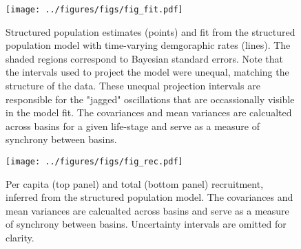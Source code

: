 \documentclass[11pt]{article}
\begin{document}
{%


\clearpage



\clearpage
\begin{figure}
\centering
\texttt{[image: ../figures/figs/fig\_fit.pdf]}
\caption{\label{fig:fit}
Structured population estimates (points) and 
fit from the structured population model 
with time-varying demgoraphic rates (lines). 
The shaded regions correspond to Bayesian standard errors.
Note that the intervals used to project the model were unequal,
matching the structure of the data.
These unequal projection intervals are responsible for the "jagged" oscillations
that are occassionally visible in the model fit.
The covariances and mean variances are calcualted across basins for a given life-stage
and serve as a measure of synchrony between basins.
}
\end{figure}
\clearpage

\clearpage
\begin{figure}
\centering
\texttt{[image: ../figures/figs/fig\_rec.pdf]}
\caption{\label{fig:rec}
Per capita (top panel) and total (bottom panel) recruitment, 
inferred from the structured population model.
The covariances and mean variances are calcualted across basins
and serve as a measure of synchrony between basins.
Uncertainty intervals are omitted for clarity.
}
\end{figure}
\clearpage

}
\end{document}
